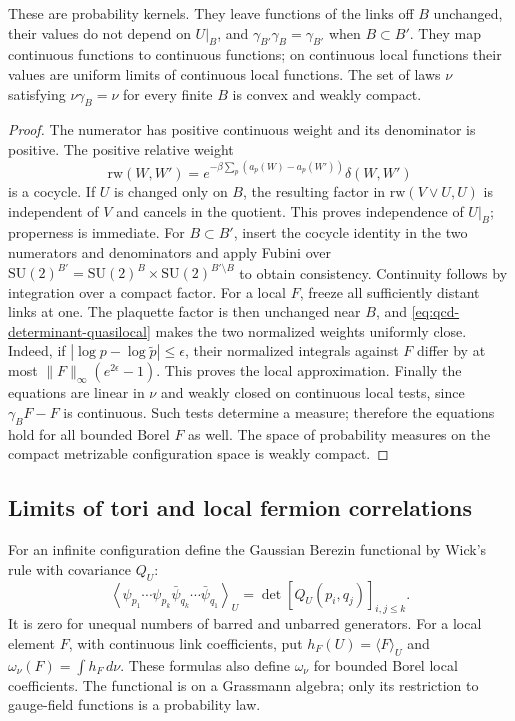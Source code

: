 \documentclass[11pt,letterpaper,reqno]{amsart}
\makeatletter
\theoremstyle{definition}
\newcommand{\ms@minorstart}{%
  \pushQED{\qed}\renewcommand{\qedsymbol}{$\blacksquare$}}
\newenvironment{lemma}[1][]{\ms@minorstart\ms@lemma[#1]}
  {\popQED\endms@lemma}
\theoremstyle{remark}
\makeatother
\begin{document}
\begin{lemma}[The specification]\label{C-386-27}
These are probability kernels. They leave functions of the links
off $B$ unchanged, their values do not depend on $U|_B$, and
$\gamma_{B'}\gamma_B=\gamma_{B'}$ when $B\subset B'$.
They map continuous functions to continuous functions; on continuous
local functions their values are uniform limits of continuous local
functions. The set of laws $\nu$ satisfying $\nu\gamma_B=\nu$
for every finite $B$ is convex and weakly compact.
\end{lemma}

\begin{proof}
The numerator has positive continuous weight and its denominator is
positive. The positive relative weight
\[
 \mathrm{rw}(W,W')=
 e^{-\beta\sum_p(a_p(W)-a_p(W'))}\delta(W,W')
\]
is a cocycle. If $U$ is changed only on $B$, the resulting factor
in $\mathrm{rw}(V\vee U,U)$ is independent of $V$ and cancels
in the quotient. This proves independence of $U|_B$; properness
is immediate. For $B\subset B'$, insert the cocycle identity in
the two numerators and denominators and apply Fubini over
$\mathrm{SU}(2)^{B'}=\mathrm{SU}(2)^B
 \times\mathrm{SU}(2)^{B'\setminus B}$ to obtain consistency.
Continuity follows by integration over a compact factor.
For a local $F$, freeze all sufficiently distant links at one.
The plaquette factor is then unchanged near $B$, and
\eqref{eq:qcd-determinant-quasilocal} makes the two normalized
weights uniformly close. Indeed, if $|\log p-\log\widetilde p|
\le\epsilon$, their normalized integrals against $F$ differ
by at most $\|F\|_\infty(e^{2\epsilon}-1)$. This proves the
local approximation. Finally the equations are linear in $\nu$
and weakly closed on continuous local tests, since
$\gamma_BF-F$ is continuous. Such tests determine a measure;
therefore the equations hold for all bounded Borel $F$ as well.
The space of probability measures on the compact metrizable
configuration space is weakly compact.
\end{proof}

\subsection{Limits of tori and local fermion correlations}

For an infinite configuration define the Gaussian Berezin
functional by Wick's rule with covariance $Q_U$:
\[
 \left\langle\psi_{p_1}\cdots\psi_{p_k}
                      \bar\psi_{q_k}\cdots\bar\psi_{q_1}\right\rangle_U
       =\det[Q_U(p_i,q_j)]_{i,j\le k}.
\]
It is zero for unequal numbers of barred and unbarred generators.
For a local element $F$, with continuous link coefficients, put
$h_F(U)=\langle F\rangle_U$ and
$\omega_\nu(F)=\int h_F\,d\nu$.
These formulas also define $\omega_\nu$ for bounded Borel local
coefficients. The functional is on a Grassmann algebra; only its
restriction to gauge-field functions is a probability law.
\end{document}
